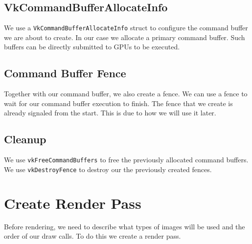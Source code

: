 \subsection{VkCommandBufferAllocateInfo}

We use a \texttt{VkCommandBufferAllocateInfo} struct to configure the command buffer we are
about to create.
In our case we allocate a primary command buffer.
Such buffers can be directly submitted to GPUs to be executed.

\begin{minipage}{\linewidth}{\noindent}
    
\end{minipage}

\subsection{Command Buffer Fence}

Together with our command buffer, we also create a fence.
We can use a fence to wait for our command buffer execution to finish.
The fence that we create is already signaled from the start.
This is due to how we will use it later.

\begin{minipage}{\linewidth}{\noindent}
    
\end{minipage}

\subsection{Cleanup}

We use \texttt{vkFreeCommandBuffers} to free the previously allocated command buffers.
We use \texttt{vkDestroyFence} to destroy our the previously created fences.

\section{Create Render Pass}

Before rendering, we need to describe what types of images will be used and the
order of our draw calls.
To do this we create a render pass.

\begin{minipage}{\linewidth}{\noindent}
    
\end{minipage}

